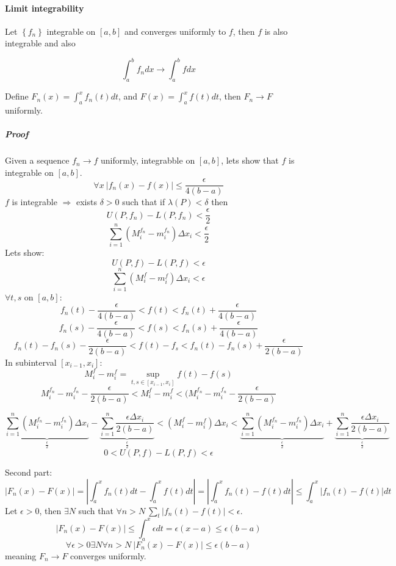 \paragraph{Limit integrability}
Let $\left\{ f_n \right\}$ integrable on $[a,b]$ and converges uniformly to $f$, then $f$ is also integrable and also

$$\int_a^b f_n dx \to \int_a^b f dx$$

Define $F_n(x) = \int_a^x f_n(t) dt$, and $F(x) = \int_a^x f(t) dt$, then $F_n\to F$ uniformly.
\subparagraph{Proof}
Given a sequence $f_n \to f$ uniformly, integrabble on $[a,b]$, lets show that $f$ is integrable on $[a,b]$.
$$\forall x \: \left|f_n(x) - f(x)\right| \leq \frac{\epsilon}{4(b-a)}$$
$f$ is integrable $\Rightarrow$ exists $\delta > 0 $ such that if $\lambda(P) < \delta$ then
$$U(P, f_n) - L(P, f_n) < \frac{\epsilon}{2}$$
$$\sum_{i=1}^n \left(M^{f_n}_i - m^{f_n}_i\right) \Delta x_i < \frac{\epsilon}{2}$$
Lets show:
$$U(P,f)  -L(P,f) < \epsilon$$
$$\sum_{i=1}^n \left(M^{f}_i - m^{f}_i\right) \Delta x_i < \epsilon$$
$\forall t,s$ on $[a,b]$:
$$f_n(t) - \frac{\epsilon}{4(b-a)} < f(t) < f_n(t) + \frac{\epsilon}{4(b-a)} $$
$$f_n(s) - \frac{\epsilon}{4(b-a)} < f(s) < f_n(s) + \frac{\epsilon}{4(b-a)} $$
$$f_n(t) - f_n(s) - \frac{\epsilon}{2(b-a)} < f(t) -f_s< f_n(t) -f_n(s) + \frac{\epsilon}{2(b-a)}$$
In subinterval $[x_{i-1}, x_i]$:
$$M^f_i - m^f_i = \sup_{t,s \in [x_{i-1}, x_i]} f(t) - f(s)$$
$$M^{f_n}_i - m^{f_n}_i - \frac{\epsilon}{2(b-a)}<M^f_i - m^f_i  <(M^{f_n}_i - m^{f_n}_i - \frac{\epsilon}{2(b-a)}$$

$$\underbrace{\sum_{i=1}^n \left(M^{f_n}_i - m^{f_n}_i\right)\Delta x_i}_{\frac{\epsilon}{2}} - \underbrace{\sum_{i=1}^n\frac{\epsilon\Delta x_i}{2(b-a)}}_{\frac{\epsilon}{2}}< \left(M^{f}_i - m^{f}_i\right) \Delta x_i  <\underbrace{\sum_{i=1}^n \left(M^{f_n}_i - m^{f_n}_i\right)\Delta x_i}_{\frac{\epsilon}{2}} + \underbrace{\sum_{i=1}^n\frac{\epsilon\Delta x_i}{2(b-a)}}_{\frac{\epsilon}{2}}$$
$$0< U(P,f) - L(P,f) < \epsilon $$

Second part:
$$\left|F_n(x) - F(x)\right| = \left| \int_a^x f_n(t) dt - \int_a^x f(t) dt \right| = \left| \int_a^x f_n(t) - f(t) dt \right|  \leq  \int_a^x \left|  f_n(t) - f(t)  \right| dt$$
Let $\epsilon > 0$, then $\exists N $ such that $\forall n > N \: \sum_t |f_n(t) - f(t)| < \epsilon$.
$$\left|F_n(x) - F(x)\right|  \leq \int_a^x \epsilon dt = \epsilon(x-a) \leq \epsilon(b-a)$$
$$\forall \epsilon > 0 \exists N \forall n > N \: \left|F_n(x) - F(x)\right|\leq \epsilon(b-a)$$
meaning $F_n \to F$ converges uniformly.
